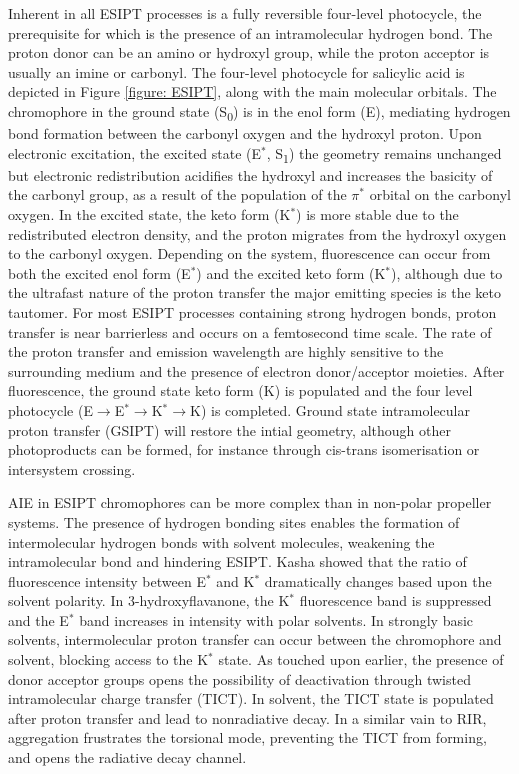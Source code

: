 Inherent in all ESIPT processes is a fully reversible four-level photocycle, the prerequisite for which is the presence of an intramolecular hydrogen bond. The proton donor can be an amino or hydroxyl group, while the proton acceptor is usually an imine or carbonyl. The four-level photocycle for salicylic acid is depicted in Figure \ref{figure: ESIPT}, along with the main molecular orbitals. The chromophore in the ground state (S\textsubscript{0}) is in the enol form (E), mediating hydrogen bond formation between the carbonyl oxygen and the hydroxyl proton. Upon electronic excitation, the excited state (E$^\ast$, S\textsubscript{1}) the geometry remains unchanged but electronic redistribution acidifies the hydroxyl and increases the basicity of the carbonyl group, as a result of the population of the $\pi^\ast$ orbital on the carbonyl oxygen. In the excited state, the keto form (K$^\ast$) is more stable due to the redistributed electron density, and the proton migrates from the hydroxyl oxygen to the carbonyl oxygen. Depending on the system, fluorescence can occur from both the excited enol form (E$^\ast$) and the excited keto form (K$^\ast$), although due to the ultrafast nature of the proton transfer the major emitting species is the keto tautomer.\cite{Zhao2012} For most ESIPT processes containing strong hydrogen bonds, proton transfer is near barrierless and  occurs on a femtosecond time scale.\cite{Padalkar2015} The rate of the proton transfer and emission wavelength are highly sensitive to the surrounding medium and the presence of electron donor/acceptor moieties.\cite{Demchenko2013,Lin2017a,Li2017c} After fluorescence, the ground state keto form (K) is populated and the four level photocycle (E$\rightarrow$E$^{\ast}$$\rightarrow$K$^{\ast}$$\rightarrow$K) is completed. Ground state intramolecular proton transfer (GSIPT) will restore the intial geometry, although other photoproducts can be formed, for instance through cis-trans isomerisation or intersystem crossing.\cite{Al-Soufi1990}

AIE in ESIPT chromophores can be more complex than in non-polar propeller systems. The presence of hydrogen bonding sites enables the formation of intermolecular hydrogen bonds with solvent molecules, weakening the intramolecular bond and hindering ESIPT.\cite{Cheng2015f} Kasha showed that the ratio of fluorescence intensity between E$^\ast$ and K$^\ast$ dramatically changes based upon the solvent polarity.\cite{Kasha1986} In 3-hydroxyflavanone, the K$^\ast$ fluorescence band is suppressed and the E$^\ast$ band increases in intensity with polar solvents. In strongly basic solvents, intermolecular proton transfer can occur between the chromophore and solvent, blocking access to the K$^\ast$ state\cite{Laurent2014}. As touched upon earlier, the presence of donor acceptor groups opens the possibility of deactivation through twisted intramolecular charge transfer (TICT). In solvent, the TICT state is populated after proton transfer and lead to nonradiative decay. In a similar vain to RIR, aggregation frustrates the torsional mode, preventing the TICT from forming, and opens the radiative decay channel.\cite{Park2017,Wu2015a}

